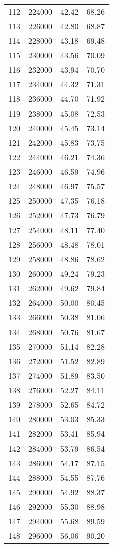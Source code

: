 \documentclass{article}
\begin{document}
\begin{longtable}{@{}l l l l}
112 & 224000 & 42.42 & 68.26\\
113 & 226000 & 42.80 & 68.87\\
114 & 228000 & 43.18 & 69.48\\
115 & 230000 & 43.56 & 70.09\\
116 & 232000 & 43.94 & 70.70\\
117 & 234000 & 44.32 & 71.31\\
118 & 236000 & 44.70 & 71.92\\
119 & 238000 & 45.08 & 72.53\\
120 & 240000 & 45.45 & 73.14\\
121 & 242000 & 45.83 & 73.75\\
122 & 244000 & 46.21 & 74.36\\
123 & 246000 & 46.59 & 74.96\\
124 & 248000 & 46.97 & 75.57\\
125 & 250000 & 47.35 & 76.18\\
126 & 252000 & 47.73 & 76.79\\
127 & 254000 & 48.11 & 77.40\\
128 & 256000 & 48.48 & 78.01\\
129 & 258000 & 48.86 & 78.62\\
130 & 260000 & 49.24 & 79.23\\
131 & 262000 & 49.62 & 79.84\\
132 & 264000 & 50.00 & 80.45\\
133 & 266000 & 50.38 & 81.06\\
134 & 268000 & 50.76 & 81.67\\
135 & 270000 & 51.14 & 82.28\\
136 & 272000 & 51.52 & 82.89\\
137 & 274000 & 51.89 & 83.50\\
138 & 276000 & 52.27 & 84.11\\
139 & 278000 & 52.65 & 84.72\\
140 & 280000 & 53.03 & 85.33\\
141 & 282000 & 53.41 & 85.94\\
142 & 284000 & 53.79 & 86.54\\
143 & 286000 & 54.17 & 87.15\\
144 & 288000 & 54.55 & 87.76\\
145 & 290000 & 54.92 & 88.37\\
146 & 292000 & 55.30 & 88.98\\
147 & 294000 & 55.68 & 89.59\\
148 & 296000 & 56.06 & 90.20\\

\end{longtable}
\end{document}
